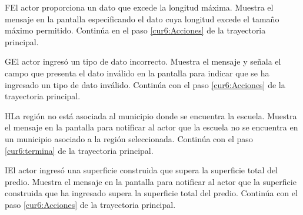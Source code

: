  \begin{UCtrayectoriaA}{F}{El actor proporciona un dato que excede la longitud máxima.}
    \UCpaso[\UCsist] Muestra el mensaje  en la pantalla  especificando el dato cuya longitud excede el tamaño máximo permitido.
   \UCpaso[] Continúa en el paso \ref{cur6:Acciones} de la trayectoria principal.
 \end{UCtrayectoriaA}

   \begin{UCtrayectoriaA}{G}{El actor ingresó un tipo de dato incorrecto.}
    \UCpaso[\UCsist] Muestra el mensaje  y señala el campo que presenta el dato inválido en la 
    pantalla  para indicar que se ha ingresado un tipo de dato inválido.
    \UCpaso[] Continúa con el paso \ref{cur6:Acciones} de la trayectoria principal.
 \end{UCtrayectoriaA}
 
   \begin{UCtrayectoriaA}{H}{La región no está asociada al municipio donde se encuentra la escuela.}
    \UCpaso[\UCsist] Muestra el mensaje  en la pantalla  para notificar al actor que la escuela no se encuentra en un municipio asociado a la región seleccionada.
    \UCpaso[] Continúa con el paso \ref{cur6:termina} de la trayectoria principal.
 \end{UCtrayectoriaA}
 
 \begin{UCtrayectoriaA}{I}{El actor ingresó una superficie construida que supera la superficie total del predio.}
  \UCpaso[\UCsist] Muestra el mensaje  en la pantalla  para notificar al actor que la superficie construida que ha ingresado supera la superficie total del predio.
    \UCpaso[] Continúa con el paso \ref{cur6:Acciones} de la trayectoria principal.
 \end{UCtrayectoriaA}

 


